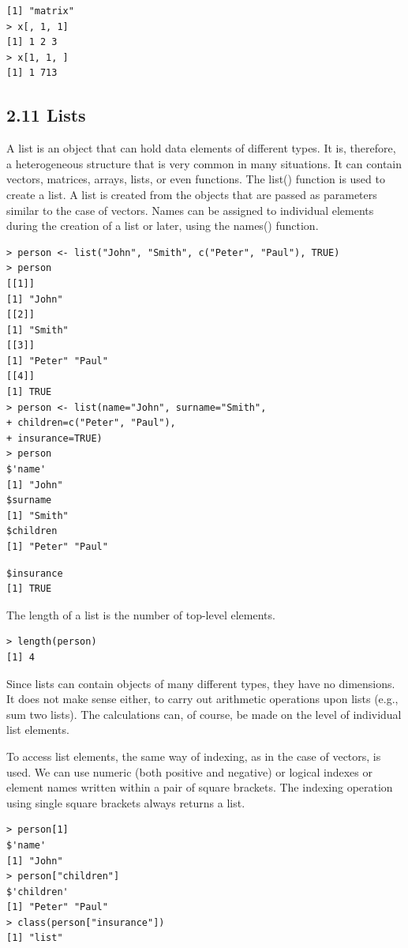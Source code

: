 \documentclass[10pt]{book}
\begin{document}
\begin{verbatim}
[1] "matrix"
> x[, 1, 1]
[1] 1 2 3
> x[1, 1, ]
[1] 1 713
\end{verbatim}

\subsection*{2.11 Lists}
A list is an object that can hold data elements of different types. It is, therefore, a heterogeneous structure that is very common in many situations. It can contain vectors, matrices, arrays, lists, or even functions. The list() function is used to create a list. A list is created from the objects that are passed as parameters similar to the case of vectors. Names can be assigned to individual elements during the creation of a list or later, using the names() function.

\begin{verbatim}
> person <- list("John", "Smith", c("Peter", "Paul"), TRUE)
> person
[[1]]
[1] "John"
[[2]]
[1] "Smith"
[[3]]
[1] "Peter" "Paul"
[[4]]
[1] TRUE
> person <- list(name="John", surname="Smith",
+ children=c("Peter", "Paul"),
+ insurance=TRUE)
> person
$'name'
[1] "John"
$surname
[1] "Smith"
$children
[1] "Peter" "Paul"
\end{verbatim}

\begin{verbatim}
$insurance
[1] TRUE
\end{verbatim}

The length of a list is the number of top-level elements.

\begin{verbatim}
> length(person)
[1] 4
\end{verbatim}

Since lists can contain objects of many different types, they have no dimensions. It does not make sense either, to carry out arithmetic operations upon lists (e.g., sum two lists). The calculations can, of course, be made on the level of individual list elements.

To access list elements, the same way of indexing, as in the case of vectors, is used. We can use numeric (both positive and negative) or logical indexes or element names written within a pair of square brackets. The indexing operation using single square brackets always returns a list.

\begin{verbatim}
> person[1]
$'name'
[1] "John"
> person["children"]
$'children'
[1] "Peter" "Paul"
> class(person["insurance"])
[1] "list"
\end{verbatim}
\end{document}
